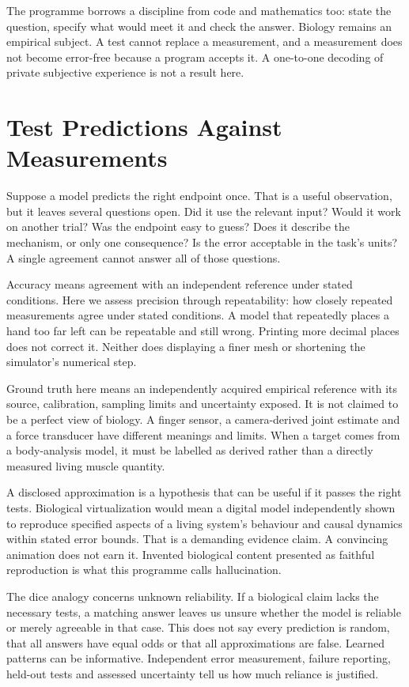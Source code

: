 The programme borrows a discipline from code and mathematics too: state the
question, specify what would meet it and check the answer. Biology remains an
empirical subject. A test cannot replace a measurement, and a measurement does
not become error-free because a program accepts it. A one-to-one decoding of
private subjective experience is not a result here.

\section{Test Predictions Against Measurements}

Suppose a model predicts the right endpoint once. That is a useful observation,
but it leaves several questions open. Did it use the relevant input? Would it
work on another trial? Was the endpoint easy to guess? Does it describe the
mechanism, or only one consequence? Is the error acceptable in the task's units?
A single agreement cannot answer all of those questions.

Accuracy means agreement with an independent reference under stated conditions.
Here we assess precision through repeatability: how closely repeated measurements agree under stated conditions.
A model that repeatedly places a hand too far left can be repeatable and still
wrong. Printing more decimal places does not correct it. Neither does displaying
a finer mesh or shortening the simulator's numerical step.\cite{nist1297}

Ground truth here means an independently acquired empirical reference with
its source, calibration, sampling limits and uncertainty exposed. It is not
claimed to be a perfect view of biology. A finger sensor, a camera-derived
joint estimate and a force transducer have different meanings and limits.
When a target comes from a body-analysis model, it must be labelled as derived
rather than a directly measured living muscle quantity.

A disclosed approximation is a hypothesis that can be useful if it passes the
right tests. Biological virtualization would mean a digital model independently
shown to reproduce specified aspects of a living system's behaviour and causal
dynamics within stated error bounds. That is a demanding evidence claim.
A convincing animation does not earn it. Invented biological content presented
as faithful reproduction is what this programme calls hallucination.

The dice analogy concerns unknown reliability. If a biological claim lacks the
necessary tests, a matching answer leaves us unsure whether the model is reliable
or merely agreeable in that case. This does not say every prediction is random,
that all answers have equal odds or that all approximations are false. Learned
patterns can be informative. Independent error measurement, failure reporting,
held-out tests and assessed uncertainty tell us how much reliance is justified.

